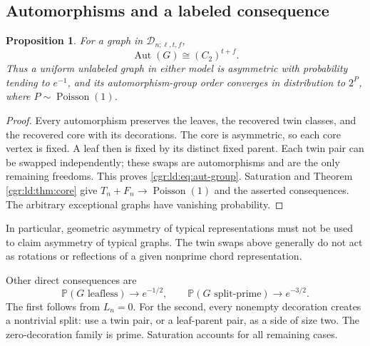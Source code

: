 \documentclass[11pt,letterpaper]{article}
\numberwithin{equation}{section}
\newtheorem{proposition}[theorem]{Proposition}
\theoremstyle{definition}\newtheorem{definition}[theorem]{Definition}
\theoremstyle{remark}\newtheorem{remark}[theorem]{Remark}
\newcommand{\PP}{\mathbb P}
\DeclareMathOperator{\Aut}{Aut}
\DeclareMathOperator{\Poi}{Poisson}
\begin{document}
\subsection{Automorphisms and a labeled consequence}\label{cgr:ld:sub:aut}
\begin{proposition}\label{cgr:ld:prop:aut}
For a graph in $\mathcal D_{n;\ell,t,f}$,
\begin{equation}\label{cgr:ld:eq:aut-group}
 \Aut(G)\cong (C_2)^{t+f}.
\end{equation}
Thus a uniform unlabeled graph in either model is asymmetric
with probability tending to $e^{-1}$, and its automorphism-group
order converges in distribution to $2^P$, where $P\sim\Poi(1)$.
\end{proposition}
\begin{proof}
Every automorphism preserves the leaves, the recovered twin
classes, and the recovered core with its decorations. The core
is asymmetric, so each core vertex is fixed. A leaf then is fixed
by its distinct fixed parent. Each twin pair can be swapped
independently; these swaps are automorphisms and are the only
remaining freedoms. This proves \eqref{cgr:ld:eq:aut-group}. Saturation
and Theorem \ref{cgr:ld:thm:core} give $T_n+F_n\to\Poi(1)$ and the
asserted consequences. The arbitrary exceptional graphs have
vanishing probability.
\end{proof}
In particular, geometric asymmetry of typical representations
must not be used to claim asymmetry of typical graphs. The twin
swaps above generally do not act as rotations or reflections of
a given nonprime chord representation.

Other direct consequences are
\begin{equation}\label{cgr:ld:eq:other-prob}
 \PP(G\text{ leafless})\longrightarrow e^{-1/2},\qquad
 \PP(G\text{ split-prime})\longrightarrow e^{-3/2}.
\end{equation}
The first follows from $L_n=0$. For the second, every nonempty
decoration creates a nontrivial split: use a twin pair, or a
leaf-parent pair, as a side of size two. The zero-decoration
family is prime. Saturation accounts for all remaining cases.
\end{document}
